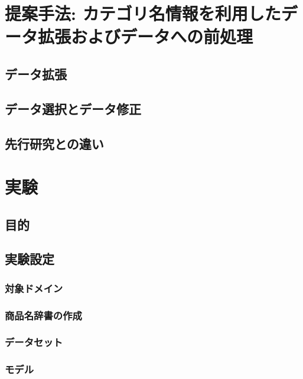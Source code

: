 \documentclass[a4paper,11pt]{jreport}
\begin{document}
\chapter{提案手法: カテゴリ名情報を利用したデータ拡張およびデータへの前処理}

\section{データ拡張}


\section{データ選択とデータ修正}

\section{先行研究との違い}





\chapter{実験}

\section{目的}


\section{実験設定}

\subsection{対象ドメイン}


\subsection{商品名辞書の作成}


\subsection{データセット}


\subsection{モデル}
\end{document}

